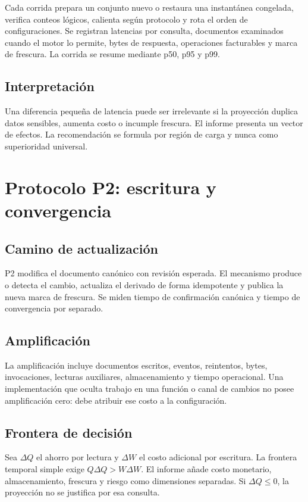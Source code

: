 Cada corrida prepara un conjunto nuevo o restaura una instantánea congelada, verifica
conteos lógicos, calienta según protocolo y rota el orden de configuraciones. Se registran
latencias por consulta, documentos examinados cuando el motor lo permite, bytes de
respuesta, operaciones facturables y marca de frescura. La corrida se resume mediante
p50, p95 y p99.

\section{Interpretación}

Una diferencia pequeña de latencia puede ser irrelevante si la proyección duplica datos
sensibles, aumenta costo o incumple frescura. El informe presenta un vector de efectos.
La recomendación se formula por región de carga y nunca como superioridad universal.

\chapter{Protocolo P2: escritura y convergencia}

\section{Camino de actualización}

P2 modifica el documento canónico con revisión esperada. El mecanismo produce o detecta
el cambio, actualiza el derivado de forma idempotente y publica la nueva marca de
frescura. Se miden tiempo de confirmación canónica y tiempo de convergencia por separado.

\section{Amplificación}

La amplificación incluye documentos escritos, eventos, reintentos, bytes, invocaciones,
lecturas auxiliares, almacenamiento y tiempo operacional. Una implementación que oculta
trabajo en una función o canal de cambios no posee amplificación cero: debe atribuir ese
costo a la configuración.

\section{Frontera de decisión}

Sea $\Delta Q$ el ahorro por lectura y $\Delta W$ el costo adicional por escritura. La
frontera temporal simple exige $Q\Delta Q>W\Delta W$. El informe añade costo monetario,
almacenamiento, frescura y riesgo como dimensiones separadas. Si $\Delta Q\leq0$, la
proyección no se justifica por esa consulta.

